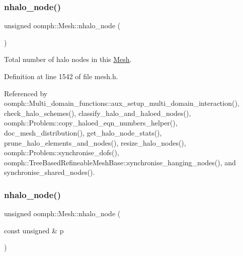 \subsubsection{\texorpdfstring{nhalo\+\_\+node()}{nhalo\_node()}\hspace{0.1cm}{\footnotesize\ttfamily [1/2]}}
{\footnotesize\ttfamily unsigned oomph\+::\+Mesh\+::nhalo\+\_\+node (\begin{DoxyParamCaption}{ }\end{DoxyParamCaption})\hspace{0.3cm}{\ttfamily [inline]}}



Total number of halo nodes in this \hyperlink{classoomph_1_1Mesh}{Mesh}. 



Definition at line 1542 of file mesh.\+h.



Referenced by oomph\+::\+Multi\+\_\+domain\+\_\+functions\+::aux\+\_\+setup\+\_\+multi\+\_\+domain\+\_\+interaction(), check\+\_\+halo\+\_\+schemes(), classify\+\_\+halo\+\_\+and\+\_\+haloed\+\_\+nodes(), oomph\+::\+Problem\+::copy\+\_\+haloed\+\_\+eqn\+\_\+numbers\+\_\+helper(), doc\+\_\+mesh\+\_\+distribution(), get\+\_\+halo\+\_\+node\+\_\+stats(), prune\+\_\+halo\+\_\+elements\+\_\+and\+\_\+nodes(), resize\+\_\+halo\+\_\+nodes(), oomph\+::\+Problem\+::synchronise\+\_\+dofs(), oomph\+::\+Tree\+Based\+Refineable\+Mesh\+Base\+::synchronise\+\_\+hanging\+\_\+nodes(), and synchronise\+\_\+shared\+\_\+nodes().

\mbox{\label{classoomph_1_1Mesh_a8117ab6fbff749fe7533203927a76fe9}} 
\subsubsection{\texorpdfstring{nhalo\+\_\+node()}{nhalo\_node()}\hspace{0.1cm}{\footnotesize\ttfamily [2/2]}}
{\footnotesize\ttfamily unsigned oomph\+::\+Mesh\+::nhalo\+\_\+node (\begin{DoxyParamCaption}\item[{const unsigned \&}]{p }\end{DoxyParamCaption})\hspace{0.3cm}{\ttfamily [inline]}}



